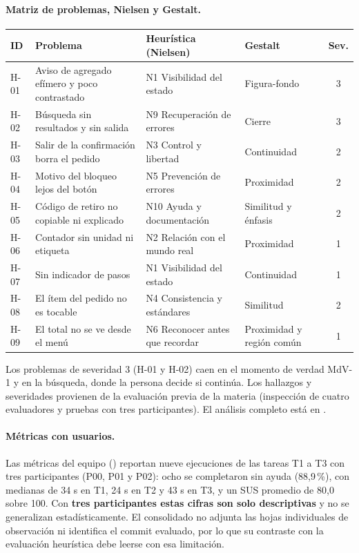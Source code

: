 \paragraph{Matriz de problemas, Nielsen y Gestalt.}
\begin{longtable}{|l|p{3.6cm}|p{3.2cm}|p{3cm}|c|}
\hline
\textbf{ID} & \textbf{Problema} & \textbf{Heurística (Nielsen)} & \textbf{Gestalt} & \textbf{Sev.} \\ \hline
H-01 & Aviso de agregado efímero y poco contrastado & N1 Visibilidad del estado & Figura-fondo & 3 \\ \hline
H-02 & Búsqueda sin resultados y sin salida & N9 Recuperación de errores & Cierre & 3 \\ \hline
H-03 & Salir de la confirmación borra el pedido & N3 Control y libertad & Continuidad & 2 \\ \hline
H-04 & Motivo del bloqueo lejos del botón & N5 Prevención de errores & Proximidad & 2 \\ \hline
H-05 & Código de retiro no copiable ni explicado & N10 Ayuda y documentación & Similitud y énfasis & 2 \\ \hline
H-06 & Contador sin unidad ni etiqueta & N2 Relación con el mundo real & Proximidad & 1 \\ \hline
H-07 & Sin indicador de pasos & N1 Visibilidad del estado & Continuidad & 1 \\ \hline
H-08 & El ítem del pedido no es tocable & N4 Consistencia y estándares & Similitud & 2 \\ \hline
H-09 & El total no se ve desde el menú & N6 Reconocer antes que recordar & Proximidad y región común & 1 \\ \hline
\end{longtable}

Los problemas de severidad 3 (H-01 y H-02) caen en el momento de verdad MdV-1 y en la búsqueda, donde la persona decide si continúa. Los hallazgos y severidades provienen de la evaluación previa de la materia (inspección de cuatro evaluadores y pruebas con tres participantes). El análisis completo está en .

\paragraph{Métricas con usuarios.} Las métricas del equipo () reportan nueve ejecuciones de las tareas T1 a T3 con tres participantes (P00, P01 y P02): ocho se completaron sin ayuda (88,9\,\%), con medianas de 34 s en T1, 24 s en T2 y 43 s en T3, y un SUS promedio de 80,0 sobre 100. Con \textbf{tres participantes estas cifras son solo descriptivas} y no se generalizan estadísticamente. El consolidado no adjunta las hojas individuales de observación ni identifica el commit evaluado, por lo que su contraste con la evaluación heurística debe leerse con esa limitación.
